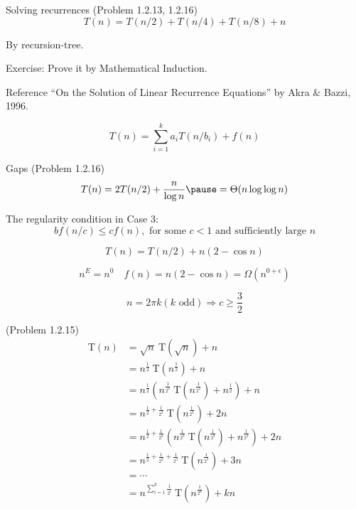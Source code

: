 \begin{frame}{Solving recurrences (Problem 1.2.13, 1.2.16)}
  \[
    T(n) = T(n/2) + T(n/4) + T(n/8) + n
  \]

  \pause
  \vspace{0.30cm}
  \centerline{By recursion-tree.}

  \pause
  \vspace{0.50cm}
  
  \centerline{Exercise: Prove it by Mathematical Induction.}

  \pause
  \begin{alertblock}{Reference}
	``On the Solution of Linear Recurrence Equations'' by Akra \& Bazzi, 1996.

	\[
	  T(n) = \sum_{i=1}^{k} a_i T(n/b_i) + f(n)
	\]
  \end{alertblock}
\end{frame}

\begin{frame}{Gaps (Problem 1.2.16)}
  \[
	T(n) = 2T(n/2) + \frac{n}{\log n} \pause = \Theta(n \log \log n)
  \]

  \pause

  The regularity condition in Case 3:
  \[
	bf(n/c) \le cf(n), \text{ for some } c < 1 \text{ and sufficiently large } n
  \]

  \[
	T(n) = T(n/2) + n(2 - \cos n)
  \]

  \[
	n^{E} = n^0 \quad f(n) = n(2 - \cos n) = \Omega(n^{0 + \epsilon})
  \]

  \pause
  \[
	n = 2\pi k (k \text{ odd}) \Rightarrow c \ge \frac{3}{2}
  \]
\end{frame}

\begin{frame}{(Problem 1.2.15)}
  \begin{align*} 
	\text{T}(n) &= \sqrt{n}\ \text{T}(\sqrt{n})+n \\
		&= n^{\frac{1}{2}}\ \text{T}\left(n^{\frac{1}{2}} \right )+n \\
		&= n^{\frac{1}{2}}\left( n^{\frac{1}{2^2}}\ \text{T}\left(n^{\frac{1}{2^2}} \right )+n^{\frac{1}{2}} \right )+n\\
		&= n^{\frac{1}{2}+\frac{1}{2^2}}\ \text{T}\left(n^{\frac{1}{2^2}}\right ) +2n\\
		&= n^{\frac{1}{2}+\frac{1}{2^2}}\left(n^{\frac{1}{2^3}}\ \text{T}\left(n^{\frac{1}{2^3}}\right ) +n^{\frac{1}{2^2}} \right )+2n\\
		&= n^{\frac{1}{2}+\frac{1}{2^2}+\frac{1}{2^3}}\ \text{T}\left(n^{\frac{1}{2^3}}\right ) +3n\\ 
		&= \cdots \\ 
		&= n^{\sum_{i=1}^{k}\frac{1}{2^i}}\ \text{T}\left(n^{\frac{1}{2^k}}\right ) +kn\\ 
  \end{align*}
\end{frame}

